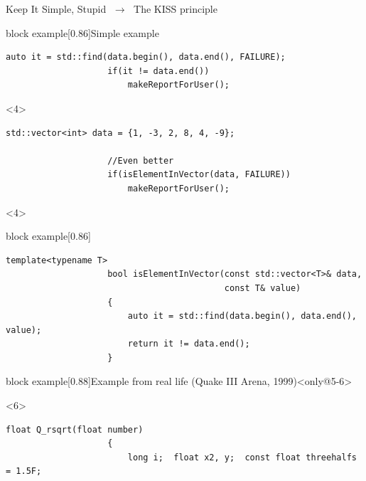 \begin{frame}[fragile]{Keep It Simple, Stupid $\;\to\;$ The KISS principle}
\begin{overlayarea}{\textwidth}{\textheight}
\begin{varblock}{block example}[0.86\textwidth]{Simple example}
\begin{onlyenv}
\begin{lstlisting}[style=MyCpp]
                    auto it = std::find(data.begin(), data.end(), FAILURE);
                    if(it != data.end())
                        makeReportForUser();
                \end{lstlisting}
            \end{onlyenv}
            \begin{onlyenv}<4>
                \begin{lstlisting}[style=MyCpp]
                    std::vector<int> data = {1, -3, 2, 8, 4, -9};

                    //Even better
                    if(isElementInVector(data, FAILURE))
                        makeReportForUser();
                \end{lstlisting}
            \end{onlyenv}
        \end{varblock}
        \begin{onlyenv}<4>
            \vspace{-2.5mm}
            \begin{varblock}{block example}[0.86\textwidth]{}
                \begin{lstlisting}[style=MyCpp]
                    template<typename T>
                    bool isElementInVector(const std::vector<T>& data,
                                           const T& value)
                    {
                        auto it = std::find(data.begin(), data.end(), value);
                        return it != data.end();
                    }
                \end{lstlisting}
            \end{varblock}
        \end{onlyenv}
        \begin{varblock}{block example}[0.88\textwidth]{Example from real life (Quake III Arena, 1999)}<only@5-6>
            \begin{uncoverenv}<6>
                \begin{lstlisting}[style=MyCpp]
                    float Q_rsqrt(float number)
                    {
                        long i;  float x2, y;  const float threehalfs = 1.5F;


\end{lstlisting}
\end{uncoverenv}
\end{varblock}
\end{overlayarea}
\end{frame}
